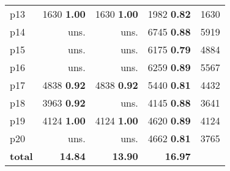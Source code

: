 \begin{tabular}{lrrrr}
\multicolumn{1}{l|}{p13} & {\footnotesize 1630} \textbf{1.00} & {\footnotesize 1630} \textbf{1.00} & {\footnotesize 1982} \textbf{0.82} & \multicolumn{1}{|r}{1630}\\
\multicolumn{1}{l|}{p14} & uns. & uns. & {\footnotesize 6745} \textbf{0.88} & \multicolumn{1}{|r}{5919}\\
\multicolumn{1}{l|}{p15} & uns. & uns. & {\footnotesize 6175} \textbf{0.79} & \multicolumn{1}{|r}{4884}\\
\multicolumn{1}{l|}{p16} & uns. & uns. & {\footnotesize 6259} \textbf{0.89} & \multicolumn{1}{|r}{5567}\\
\multicolumn{1}{l|}{p17} & {\footnotesize 4838} \textbf{0.92} & {\footnotesize 4838} \textbf{0.92} & {\footnotesize 5440} \textbf{0.81} & \multicolumn{1}{|r}{4432}\\
\multicolumn{1}{l|}{p18} & {\footnotesize 3963} \textbf{0.92} & uns. & {\footnotesize 4145} \textbf{0.88} & \multicolumn{1}{|r}{3641}\\
\multicolumn{1}{l|}{p19} & {\footnotesize 4124} \textbf{1.00} & {\footnotesize 4124} \textbf{1.00} & {\footnotesize 4620} \textbf{0.89} & \multicolumn{1}{|r}{4124}\\
\multicolumn{1}{l|}{p20} & uns. & uns. & {\footnotesize 4662} \textbf{0.81} & \multicolumn{1}{|r}{3765}\\
\midrule
\textbf{total} & \textbf{14.84} & \textbf{13.90} & \textbf{16.97} & \\
\bottomrule
\end{tabular}

